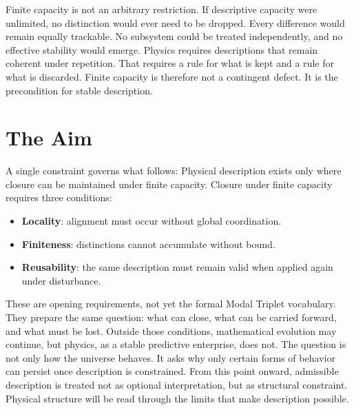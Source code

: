 \documentclass[11pt,twoside,openright]{book}
\begin{document}
Finite capacity is not an arbitrary restriction. If descriptive capacity were unlimited, no distinction would ever need to be dropped. Every difference would remain equally trackable. No subsystem could be treated independently, and no effective stability would emerge. Physics requires descriptions that remain coherent under repetition. That requires a rule for what is kept and a rule for what is discarded. Finite capacity is therefore not a contingent defect. It is the precondition for stable description.

\section*{The Aim}

A single constraint governs what follows: Physical description exists only where closure can be maintained under finite capacity. Closure under finite capacity requires three conditions:

\begin{itemize}
\item \textbf{Locality}: alignment must occur without global coordination.
\item \textbf{Finiteness}: distinctions cannot accumulate without bound.
\item \textbf{Reusability}: the same description must remain valid when applied again under disturbance.
\end{itemize}

These are opening requirements, not yet the formal Modal Triplet vocabulary. They prepare the same question: what can close, what can be carried forward, and what must be lost. Outside those conditions, mathematical evolution may continue, but physics, as a stable predictive enterprise, does not. The question is not only how the universe behaves. It asks why only certain forms of behavior can persist once description is constrained. From this point onward, admissible description is treated not as optional interpretation, but as structural constraint. Physical structure will be read through the limits that make description possible.
\end{document}
